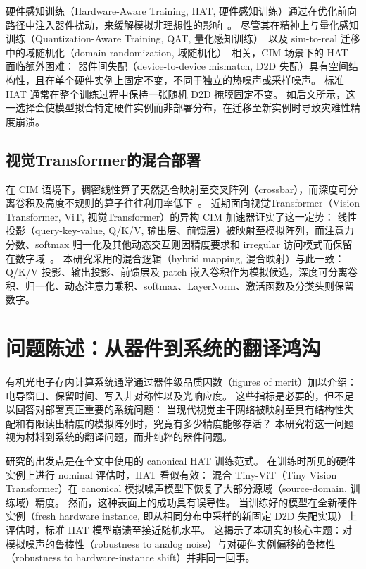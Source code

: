 硬件感知训练（Hardware-Aware Training, HAT, 硬件感知训练）通过在优化前向路径中注入器件扰动，来缓解模拟非理想性的影响~\citep{joshi2020accurate}。
尽管其在精神上与量化感知训练（Quantization-Aware Training, QAT, 量化感知训练）~\citep{choi2019pact}以及 sim-to-real 迁移中的域随机化（domain randomization, 域随机化）~\citep{tobin2017domain}相关，CIM 场景下的 HAT 面临额外困难：
器件间失配（device-to-device mismatch, D2D 失配）具有空间结构性，且在单个硬件实例上固定不变，不同于独立的热噪声或采样噪声。
标准 HAT 通常在整个训练过程中保持一张随机 D2D 掩膜固定不变。
如后文所示，这一选择会使模型拟合特定硬件实例而非部署分布，在迁移至新实例时导致灾难性精度崩溃。

\subsection{视觉Transformer的混合部署}

在 CIM 语境下，稠密线性算子天然适合映射至交叉阵列（crossbar），而深度可分离卷积及高度不规则的算子往往利用率低下~\citep{wu2023bwq,wang2024epim,ge2024allspark}。
近期面向视觉Transformer（Vision Transformer, ViT, 视觉Transformer）的异构 CIM 加速器证实了这一定势：
线性投影（query-key-value, Q/K/V, 输出层、前馈层）被映射至模拟阵列，而注意力分数、softmax 归一化及其他动态交互则因精度要求和 irregular 访问模式而保留在数字域~\citep{kim2025hemlet,lin2024hardsea}。
本研究采用的混合逻辑（hybrid mapping, 混合映射）与此一致：
Q/K/V 投影、输出投影、前馈层及 patch 嵌入卷积作为模拟候选，深度可分离卷积、归一化、动态注意力乘积、softmax、LayerNorm、激活函数及分类头则保留数字。

\section{问题陈述：从器件到系统的翻译鸿沟}

有机光电子存内计算系统通常通过器件级品质因数（figures of merit）加以介绍：电导窗口、保留时间、写入非对称性以及光响应度。
这些指标是必要的，但不足以回答对部署真正重要的系统问题：
当现代视觉主干网络被映射至具有结构性失配和有限读出精度的模拟阵列时，究竟有多少精度能够存活？
本研究将这一问题视为材料到系统的翻译问题，而非纯粹的器件问题。

研究的出发点是在全文中使用的 canonical HAT 训练范式。
在训练时所见的硬件实例上进行 nominal 评估时，HAT 看似有效：
混合 Tiny-ViT（Tiny Vision Transformer）在 canonical 模拟噪声模型下恢复了大部分源域（source-domain, 训练域）精度。
然而，这种表面上的成功具有误导性。
当训练好的模型在全新硬件实例（fresh hardware instance, 即从相同分布中采样的新固定 D2D 失配实现）上评估时，标准 HAT 模型崩溃至接近随机水平。
这揭示了本研究的核心主题：对模拟噪声的鲁棒性（robustness to analog noise）与对硬件实例偏移的鲁棒性（robustness to hardware-instance shift）并非同一回事。

